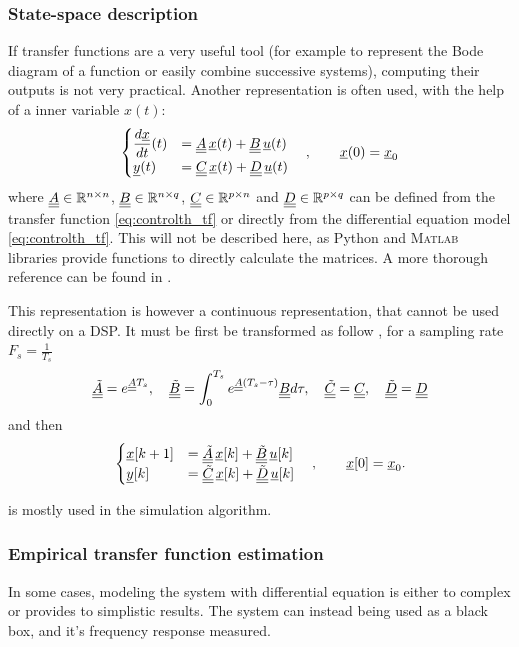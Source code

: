 \subsubsection{State-space description}
If transfer functions are a very useful tool (for example to represent the Bode diagram of a function or easily combine successive systems), computing their outputs is not very practical. Another representation is often used, with the help of a inner variable $x(t)$:
\begin{equation}
\begin{cases}
	\dfrac{d \underline{x}}{dt}(t) &= \underline{\underline{A}}\,\underline{x}(t) + \underline{\underline{B}}\, \underline{u}(t) \\
	\underline{y}(t) &= \underline{\underline{C}}\,\underline{x}(t) + \underline{\underline{D}} \,\underline{u}(t)
\end{cases}
\quad , \qquad \underline{x}(0) = \underline{x}_0
\end{equation}
where $\underline{\underline{A}} \in \mathbb{R}^{n \times n}$, $\underline{\underline{B}} \in \mathbb{R}^{n \times q}$, $\underline{\underline{C}} \in \mathbb{R}^{p \times n}$ and $\underline{\underline{D}} \in \mathbb{R}^{p \times q}$ can be defined from the transfer function \cref{eq:controlth_tf} or directly from the differential equation model \cref{eq:controlth_tf}. This will not be described here, as Python and \textsc{Matlab} libraries provide functions to directly calculate the matrices. A more thorough reference can be found in \cite{lect:king-ident}.

This representation is however a continuous representation, that cannot be used directly on a DSP. It must be first be transformed as follow \cite{lect:king-ident}, for a sampling rate $F_s = \frac{1}{T_s}$ 
\begin{equation}
	\underline{\underline{\tilde{A}}} = e^{\underline{\underline{A}} T_s}, \quad
	\underline{\underline{\tilde{B}}} = \int_0^{T_s} e^{\underline{\underline{A}} (T_s-\tau)} \underline{\underline{B}} d\tau,\quad
	\underline{\underline{\tilde{C}}} = \underline{\underline{C}}, \quad
	\underline{\underline{\tilde{D}}} = \underline{\underline{D}}
\end{equation}
and then 
\begin{equation}
\label{eq:controlth_ss}
	\begin{cases}
		\underline{x}[k+1] &= \underline{\underline{\tilde{A}}}\,\underline{x}[k] + \underline{\underline{\tilde{B}}}\, \underline{u}[k] \\
		\underline{y}[k] &= \underline{\underline{\tilde{C}}}\,\underline{x}[k] + \underline{\underline{\tilde{D}}} \,\underline{u}[k]
	\end{cases}
	\quad , \qquad \underline{x}[0] = \underline{x}_0.
\end{equation}

 is mostly used in the simulation algorithm.

\subsubsection{Empirical transfer function estimation}
In some cases, modeling the system with differential equation is either to complex or provides to simplistic results. The system can instead being used as a black box, and it's frequency response measured.

